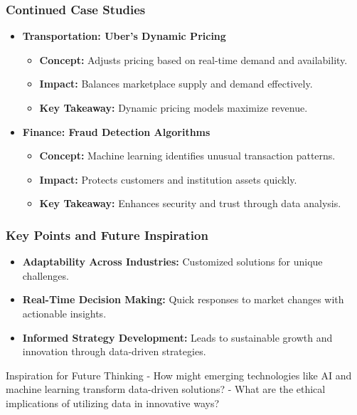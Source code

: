 \documentclass[aspectratio=169]{beamer}
\begin{document}
\begin{frame}[fragile]
    \frametitle{Continued Case Studies}
    \begin{itemize}
        \item \textbf{Transportation: Uber’s Dynamic Pricing}
            \begin{itemize}
                \item \textbf{Concept:} Adjusts pricing based on real-time demand and availability.
                \item \textbf{Impact:} Balances marketplace supply and demand effectively.
                \item \textbf{Key Takeaway:} Dynamic pricing models maximize revenue.
            \end{itemize}
        \item \textbf{Finance: Fraud Detection Algorithms}
            \begin{itemize}
                \item \textbf{Concept:} Machine learning identifies unusual transaction patterns.
                \item \textbf{Impact:} Protects customers and institution assets quickly.
                \item \textbf{Key Takeaway:} Enhances security and trust through data analysis.
            \end{itemize}
    \end{itemize}
\end{frame}

\begin{frame}[fragile]
    \frametitle{Key Points and Future Inspiration}
    \begin{itemize}
        \item \textbf{Adaptability Across Industries:} Customized solutions for unique challenges.
        \item \textbf{Real-Time Decision Making:} Quick responses to market changes with actionable insights.
        \item \textbf{Informed Strategy Development:} Leads to sustainable growth and innovation through data-driven strategies.
    \end{itemize}
    
    \begin{block}{Inspiration for Future Thinking}
        - How might emerging technologies like AI and machine learning transform data-driven solutions?
        - What are the ethical implications of utilizing data in innovative ways?
    \end{block}
\end{frame}
\end{document}
